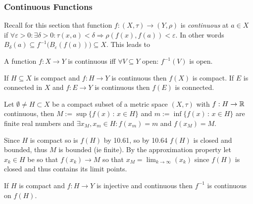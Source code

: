 \newpage
\begin{multicols}{2}
\subsubsection*{Continuous Functions}

Recall for this section that function $f:(X,\tau)\to (Y,\rho)$ is \textit{continuous} at $a\in X$ if $\forall\varepsilon>0:\exists\delta>0:\tau(x,a)<\delta\Rightarrow\rho(f(x),f(a))<\varepsilon$. In other words $B_\delta(a)\subseteq f^{-1}\big(B_\varepsilon(f(a))\big)\subseteq X$. This leads to

\begin{theorem}[Continuity]
A function $f:X\to Y$ is continuous iff $\forall V\subseteq Y$ open: $f^{-1}(V)$ is open.
\end{theorem}

\begin{theorem}[10.61 and 10.62]
If $H\subseteq X$ is compact and $f:H\to Y$ is continuous then $f(X)$ is compact. If $E$ is connected in $X$ and $f:E\to Y$ is continuous then $f(E)$ is connected.
\end{theorem}

\begin{theorem}
Let $\emptyset\neq H \subset X$ be a compact subset of a metric space $(X,\tau)$ with $f:H\to\mathbb{R}$ continuous, then $M:=\sup\{f(x)\,:\,x\in H\}$ and $m:=\inf\{f(x)\,:\,x\in H\}$ are finite real numbers and $\exists x_M,x_m\in H: f(x_m)=m$ and $f(x_M)=M$.
\end{theorem}
\begin{proof1}
Since $H$ is compact so is $f(H)$ by 10.61, so by 10.64 $f(H)$ is closed and bounded, thus $M$ is bounded (ie finite). By the approximation property let $x_k\in H$ be so that $f(x_k)\to M$ so that $x_M=\lim_{k\to\infty}(x_k)$ since $f(H)$ is closed and thus contains its limit points.
\end{proof1}

\begin{theorem}[10.64]
If $H$ is compact and $f:H\to Y$ is injective and continuous then $f^{-1}$ is continuous on $f(H)$.
\end{theorem}

\end{multicols}